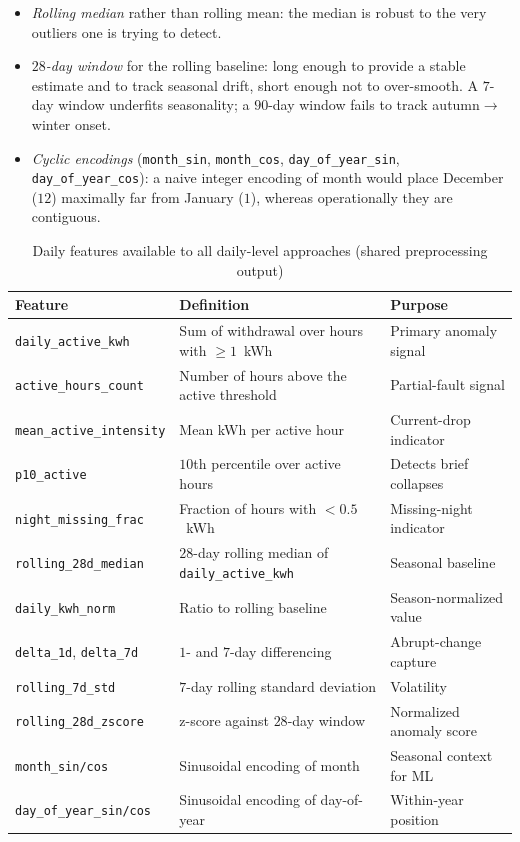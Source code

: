 \documentclass{article}
\begin{document}
\begin{itemize}[leftmargin=1.5em,itemsep=1pt]
  \item \emph{Rolling median} rather than rolling mean: the median is robust to the very outliers one is trying to detect.
  \item \emph{$28$-day window} for the rolling baseline: long enough to provide a stable estimate and to track seasonal drift, short enough not to over-smooth. A $7$-day window underfits seasonality; a $90$-day window fails to track autumn$\to$winter onset.
  \item \emph{Cyclic encodings} (\texttt{month\_sin}, \texttt{month\_cos}, \texttt{day\_of\_year\_sin}, \texttt{day\_of\_year\_cos}): a naive integer encoding of month would place December ($12$) maximally far from January ($1$), whereas operationally they are contiguous.
\end{itemize}

\begin{table}[H]
\centering
\caption{Daily features available to all daily-level approaches (shared preprocessing output)}
\label{tab:daily_features}
\small
\begin{tabular}{p{3.3cm}p{5.5cm}p{5.2cm}}
\toprule
\textbf{Feature} & \textbf{Definition} & \textbf{Purpose}\\
\midrule
\texttt{daily\_active\_kwh}      & Sum of withdrawal over hours with $\geq 1$~kWh & Primary anomaly signal\\
\texttt{active\_hours\_count}    & Number of hours above the active threshold & Partial-fault signal\\
\texttt{mean\_active\_intensity} & Mean kWh per active hour & Current-drop indicator\\
\texttt{p10\_active}             & $10$th percentile over active hours & Detects brief collapses\\
\texttt{night\_missing\_frac}    & Fraction of hours with $<0.5$~kWh & Missing-night indicator\\
\texttt{rolling\_28d\_median}    & $28$-day rolling median of \texttt{daily\_active\_kwh} & Seasonal baseline\\
\texttt{daily\_kwh\_norm}        & Ratio to rolling baseline & Season-normalized value\\
\texttt{delta\_1d}, \texttt{delta\_7d} & $1$- and $7$-day differencing & Abrupt-change capture\\
\texttt{rolling\_7d\_std}        & $7$-day rolling standard deviation & Volatility\\
\texttt{rolling\_28d\_zscore}    & z-score against $28$-day window & Normalized anomaly score\\
\texttt{month\_sin/cos}          & Sinusoidal encoding of month & Seasonal context for ML\\
\texttt{day\_of\_year\_sin/cos}  & Sinusoidal encoding of day-of-year & Within-year position\\
\bottomrule
\end{tabular}
\end{table}
\end{document}

